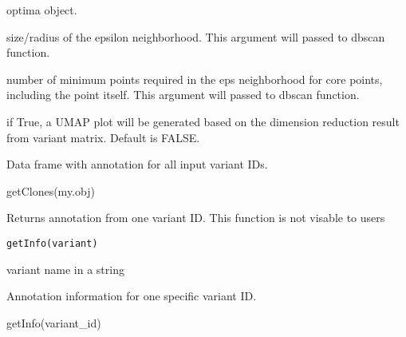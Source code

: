 \documentclass[a4paper]{book}
\begin{document}
%
\begin{Arguments}
\begin{ldescription}
\item[\code{optima.obj}] optima object.

\item[\code{eps}] size/radius of the epsilon neighborhood.
This argument will passed to dbscan function.

\item[\code{minPts}] number of minimum points required in the eps neighborhood
for core points, including the point itself.
This argument will passed to dbscan function.

\item[\code{plot}] if True, a UMAP plot will be generated based on the dimension reduction
result from variant matrix.
Default is FALSE.
\end{ldescription}
\end{Arguments}
%
\begin{Value}
Data frame with annotation for all input variant IDs.
\end{Value}
%
\begin{Examples}
\begin{ExampleCode}
getClones(my.obj)
\end{ExampleCode}
\end{Examples}
%
\begin{Description}\relax
Returns annotation from one variant ID. This function is not visable to users
\end{Description}
%
\begin{Usage}
\begin{verbatim}
getInfo(variant)
\end{verbatim}
\end{Usage}
%
\begin{Arguments}
\begin{ldescription}
\item[\code{variant}] variant name in a string
\end{ldescription}
\end{Arguments}
%
\begin{Value}
Annotation information for one specific variant ID.
\end{Value}
%
\begin{Examples}
\begin{ExampleCode}
getInfo(variant_id)
\end{ExampleCode}
\end{Examples}
\end{document}
